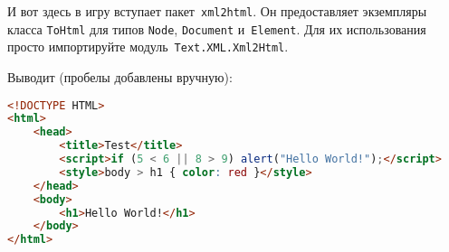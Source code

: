 И вот здесь в игру вступает пакет~\texttt{xml2html}. Он предоставляет
экземпляры класса \lstinline!ToHtml! для типов \lstinline!Node!,
\lstinline!Document! и~\lstinline!Element!. Для их использования просто
импортируйте модуль~\lstinline'Text.XML.Xml2Html'.


Выводит (пробелы добавлены вручную):

\begin{lstlisting}[language=HTML]
<!DOCTYPE HTML>
<html>
    <head>
        <title>Test</title>
        <script>if (5 < 6 || 8 > 9) alert("Hello World!");</script>
        <style>body > h1 { color: red }</style>
    </head>
    <body>
        <h1>Hello World!</h1>
    </body>
</html>
\end{lstlisting}%
